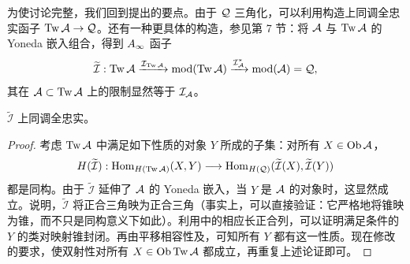 为使讨论完整，我们回到提出的要点。由于 $\mathcal Q$ 三角化，可以利用构造上同调全忠实函子 $\operatorname{Tw}\mathcal A\to\mathcal Q$。还有一种更具体的构造，参见第 7 节：将 $\mathcal A$ 与 $\operatorname{Tw}\mathcal A$ 的 Yoneda 嵌入组合，得到 $A_\infty$ 函子
\[
\widetilde{\mathcal I}:\operatorname{Tw}\mathcal A\xrightarrow{\mathcal I_{\operatorname{Tw}\mathcal A}}\operatorname{mod}(\operatorname{Tw}\mathcal A)\xrightarrow{\mathcal I_{\mathcal A}^{*}}\operatorname{mod}(\mathcal A)=\mathcal Q,
\]
其在 $\mathcal A\subset\operatorname{Tw}\mathcal A$ 上的限制显然等于 $\mathcal I_{\mathcal A}$。
\begin{lemma}\label{st:3.36}
$\widetilde{\mathcal I}$ 上同调全忠实。
\end{lemma}
\begin{proof}
考虑 $\operatorname{Tw}\mathcal A$ 中满足如下性质的对象 $Y$ 所成的子集：对所有 $X\in\operatorname{Ob}\mathcal A$，
\begin{equation}\label{eq:3.34}
H(\widetilde{\mathcal I}):\operatorname{Hom}_{H(\operatorname{Tw}\mathcal A)}(X,Y)\longrightarrow\operatorname{Hom}_{H(\mathcal Q)}(\widetilde{\mathcal I}(X),\widetilde{\mathcal I}(Y))
\end{equation}
都是同构。由于 $\widetilde{\mathcal I}$ 延伸了 $\mathcal A$ 的 Yoneda 嵌入，当 $Y$ 是 $\mathcal A$ 的对象时，这显然成立。说明，$\widetilde{\mathcal I}$ 将正合三角映为正合三角（事实上，可以直接验证：它严格地将锥映为锥，而不只是同构意义下如此）。利用中的相应长正合列，可以证明满足条件的 $Y$ 的类对映射锥封闭。再由平移相容性及，可知所有 $Y$ 都有这一性质。现在修改的要求，使双射性对所有 $X\in\operatorname{Ob}\operatorname{Tw}\mathcal A$ 都成立，再重复上述论证即可。
\end{proof}
